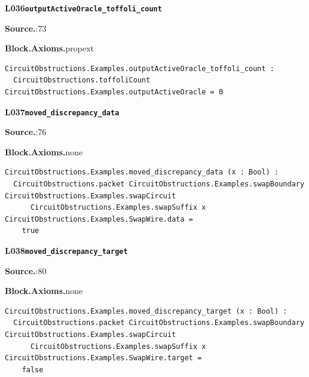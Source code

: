 \par\medskip\noindent\begin{minipage}{\textwidth}
{\small\bfseries L036\enspace\texttt{outputActiveOracle\_toffoli\_count}\par}
{\footnotesize\raggedright\textbf{Source.}\enspace{}:73\par
\textbf{Block.}\quad\textbf{Axioms.}\enspace propext\par}\nopagebreak
\begin{lstlisting}
CircuitObstructions.Examples.outputActiveOracle_toffoli_count :
  CircuitObstructions.toffoliCount CircuitObstructions.Examples.outputActiveOracle = 0
\end{lstlisting}
\end{minipage}\par

\par\medskip\noindent\begin{minipage}{\textwidth}
{\small\bfseries L037\enspace\texttt{moved\_discrepancy\_data}\par}
{\footnotesize\raggedright\textbf{Source.}\enspace{}:76\par
\textbf{Block.}\quad\textbf{Axioms.}\enspace none\par}\nopagebreak
\begin{lstlisting}
CircuitObstructions.Examples.moved_discrepancy_data (x : Bool) :
  CircuitObstructions.packet CircuitObstructions.Examples.swapBoundary CircuitObstructions.Examples.swapCircuit
      CircuitObstructions.Examples.swapSuffix x CircuitObstructions.Examples.SwapWire.data =
    true
\end{lstlisting}
\end{minipage}\par

\par\medskip\noindent\begin{minipage}{\textwidth}
{\small\bfseries L038\enspace\texttt{moved\_discrepancy\_target}\par}
{\footnotesize\raggedright\textbf{Source.}\enspace{}:80\par
\textbf{Block.}\quad\textbf{Axioms.}\enspace none\par}\nopagebreak
\begin{lstlisting}
CircuitObstructions.Examples.moved_discrepancy_target (x : Bool) :
  CircuitObstructions.packet CircuitObstructions.Examples.swapBoundary CircuitObstructions.Examples.swapCircuit
      CircuitObstructions.Examples.swapSuffix x CircuitObstructions.Examples.SwapWire.target =
    false
\end{lstlisting}
\end{minipage}\par

